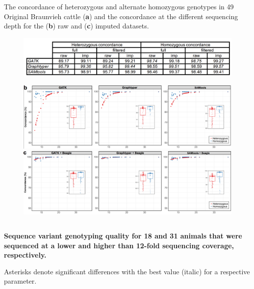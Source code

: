 \documentclass[../main.tex]{subfiles}
\begin{document}
\begin{flushleft}
\begin{landscape}
The concordance of heterozygous and alternate homozygous genotypes in 49 Original Braunvieh cattle (\textbf{a}) and the concordance at the different sequencing depth for the (\textbf{b}) raw and (\textbf{c}) imputed datasets.

\bigskip
\bigskip
\bigskip

    
    \begin{figure}[!htb]
        \centering
        \includegraphics[width=1.4\textwidth]{paper1/supplement/sp31.png}
    \end{figure} 

    \begin{figure}[!htb]
        \centering
        \includegraphics[width=1.5\textwidth]{paper1/supplement/sp32.png}
        \includegraphics[width=1.5\textwidth]{paper1/supplement/sp33.png}
    \end{figure}

\newpage


\subsection{}
\label{supp_mat:24}
\textbf{\large{Sequence variant genotyping quality for 18 and 31 animals that were sequenced at a lower and higher than 12-fold sequencing coverage, respectively.}}

Asterisks denote significant differences with the best value (italic) for a respective parameter.


\end{landscape}
\end{flushleft}
\end{document}
